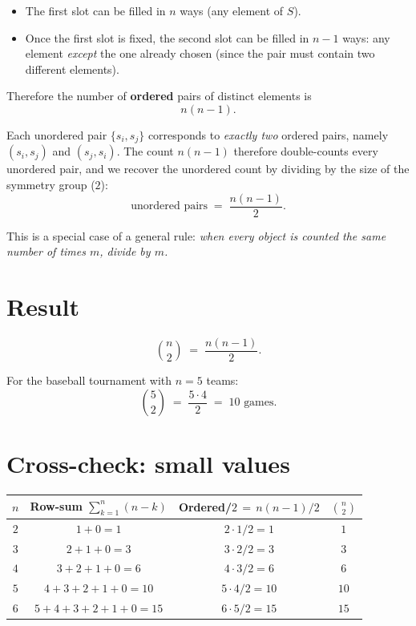 \documentclass[11pt]{article}
\begin{document}
\begin{itemize}
  \item The first slot can be filled in $n$ ways (any element of $S$).
  \item Once the first slot is fixed, the second slot can be filled in $n-1$ ways: any element \emph{except} the one already chosen (since the pair must contain two different elements).
\end{itemize}

Therefore the number of \textbf{ordered} pairs of distinct elements is
\[
  n(n-1).
\]

\begin{tcolorbox}[mybox, title=From ordered to unordered: the division principle]
Each unordered pair $\{s_i, s_j\}$ corresponds to \emph{exactly two} ordered pairs, namely $(s_i, s_j)$ and $(s_j, s_i)$. The count $n(n-1)$ therefore double-counts every unordered pair, and we recover the unordered count by dividing by the size of the symmetry group ($2$):
\[
  \text{unordered pairs} \;=\; \frac{n(n-1)}{2}.
\]
\end{tcolorbox}

This is a special case of a general rule: \emph{when every object is counted the same number of times $m$, divide by $m$.}

\section*{Result}

\begin{tcolorbox}[resultbox, title=Number of unordered pairs from $n$ distinct elements]
\[
  \binom{n}{2} \;=\; \frac{n(n-1)}{2}.
\]

\medskip
For the baseball tournament with $n=5$ teams:
\[
  \binom{5}{2} \;=\; \frac{5\cdot 4}{2} \;=\; 10 \text{ games.}
\]
\end{tcolorbox}

\section*{Cross-check: small values}

\begin{center}
\renewcommand{\arraystretch}{1.2}
\begin{tabular}{@{}cccc@{}}
\toprule
$n$ & Row-sum $\sum_{k=1}^{n}(n-k)$ & Ordered/$2 \,=\, n(n-1)/2$ & $\binom{n}{2}$ \\
\midrule
$2$ & $1+0 = 1$              & $2\cdot 1/2 = 1$    & $1$  \\
$3$ & $2+1+0 = 3$            & $3\cdot 2/2 = 3$    & $3$  \\
$4$ & $3+2+1+0 = 6$          & $4\cdot 3/2 = 6$    & $6$  \\
$5$ & $4+3+2+1+0 = 10$       & $5\cdot 4/2 = 10$   & $10$ \\
$6$ & $5+4+3+2+1+0 = 15$     & $6\cdot 5/2 = 15$   & $15$ \\
\bottomrule
\end{tabular}
\end{center}
\end{document}
